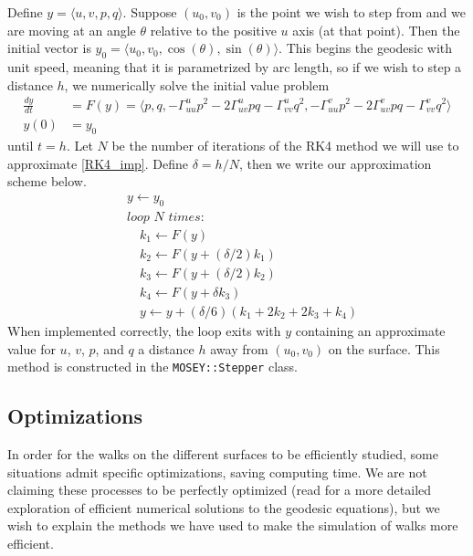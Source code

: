 \documentclass{article}
\begin{document}
		Define $y = \langle u , v , p , q \rangle$.
		Suppose $(u_0,v_0)$ is the point we wish to step from and we are moving at an angle $\theta$ relative to the positive $u$ axis (at that point).
		Then the initial vector is $y_0 = \langle u_0 , v_0 , \cos(\theta) , \sin(\theta) \rangle$.
		This begins the geodesic with unit speed, meaning that it is parametrized by arc length, so if we wish to step a distance $h$, we numerically solve the initial value problem
		\begin{equation} \label{RK4_imp} \begin{split}
			\frac{dy}{dt} & = F(y) = \langle p , q , -\Gamma^u_{uu}p^2-2\Gamma^u_{uv}pq-\Gamma^u_{vv}q^2 , -\Gamma^v_{uu}p^2-2\Gamma^v_{uv}pq-\Gamma^v_{vv}q^2 \rangle \\
			y(0) & = y_0
		\end{split} \end{equation}
		until $t = h$.
		Let $N$ be the number of iterations of the RK4 method we will use to approximate \ref{RK4_imp}.
		Define $\delta = h/N$, then we write our approximation scheme below.
		\begin{equation} \label{RK4_alg} \begin{split}
			& y \gets y_0 \\
			& \textit{loop } N \textit{ times:} \\
			& \quad k_1 \gets F(y) \\
			& \quad k_2 \gets F\left(y+(\delta/2)k_1\right) \\
			& \quad k_3 \gets F\left(y+(\delta/2)k_2\right) \\
			& \quad k_4 \gets F\left(y + \delta k_3\right) \\
			& \quad y \gets y+(\delta/6)(k_1+2k_2+2k_3+k_4)
		\end{split} \end{equation}
		When implemented correctly, the loop exits with $y$ containing an approximate value for $u$, $v$, $p$, and $q$ a distance $h$ away from $(u_0, v_0)$ on the surface.
		This method is constructed in the \texttt{MOSEY::Stepper} class.
		
	\subsection{Optimizations}
		In order for the walks on the different surfaces to be efficiently studied, some situations admit specific optimizations, saving computing time.
		We are not claiming these processes to be perfectly optimized (read \cite{Redfield_NumericalGeodesics_2007} for a more detailed exploration of efficient numerical solutions to the geodesic equations), but we wish to explain the methods we have used to make the simulation of walks more efficient.
		
\end{document}
